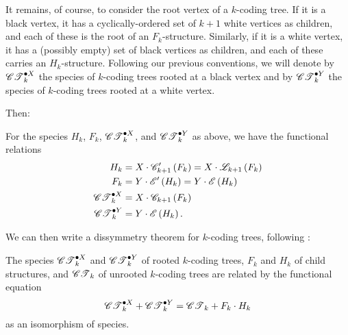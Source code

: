 \documentclass[sectionflow,singlespace,twoside,boldmathhdr]{brandiss} %
\numberwithin{section}{chapter}
\numberwithin{figure}{chapter}
\begin{document}
It remains, of course, to consider the root vertex of a $k$-coding tree.
If it is a black vertex, it has a cyclically-ordered set of $k+1$ white vertices as children, and each of these is the root of an $F_{k}$-structure.
Similarly, if it is a white vertex, it has a (possibly empty) set of black vertices as children, and each of these carries an $H_{k}$-structure.
Following our previous conventions, we will denote by $\pointed[X]{\specname{CT}}_{k}$ the species of $k$-coding trees rooted at a black vertex and by $\pointed[Y]{\specname{CT}}_{k}$ the species of $k$-coding trees rooted at a white vertex.

Then:
\begin{theorem}\label{thm:funcdecompco}
  For the species $H_{k}$, $F_{k}$, $\pointed[X]{\specname{CT}}_{k}$, and $\pointed[Y]{\specname{CT}}_{k}$ as above, we have the functional relations
  \begin{align}
    H_{k} &= X \cdot \specname{C}'_{k+1} \pbrac{F_{k}} = X \cdot \specname{L}_{k+1} \pbrac{F_{k}} \label{eq:hfuncorig} \\
    F_{k} &= Y \cdot \specname{E}' \pbrac{H_{k}} = Y \cdot \specname{E} \pbrac{H_{k}} \label{eq:ffuncorig} \\
    \pointed[X]{\specname{CT}}_{k} &= X \cdot \specname{C}_{k+1} \pbrac{F_{k}} \label{eq:axfuncorig} \\
    \pointed[Y]{\specname{CT}}_{k} &= Y \cdot \specname{E} \pbrac{H_{k}} \label{eq:ayfuncorig}.
  \end{align}
\end{theorem}

We can then write a dissymmetry theorem for $k$-coding trees, following \cite[\S 3.2, eq.\ (54)]{bll:species}:
\begin{theorem}
  \label{thm:dissymco}
  The species $\pointed[X]{\specname{CT}}_{k}$ and $\pointed[Y]{\specname{CT}}_{k}$ of rooted $k$-coding trees, $F_{k}$ and $H_{k}$ of child structures, and $\specname{CT}_{k}$ of unrooted $k$-coding trees are related by the functional equation
  \begin{equation}
    \label{eq:dissymco}
    \pointed[X]{\specname{CT}}_{k} + \pointed[Y]{\specname{CT}}_{k} = \specname{CT}_{k} + F_{k} \cdot H_{k}
  \end{equation}
  as an isomorphism of species.
\end{theorem}
\end{document}
